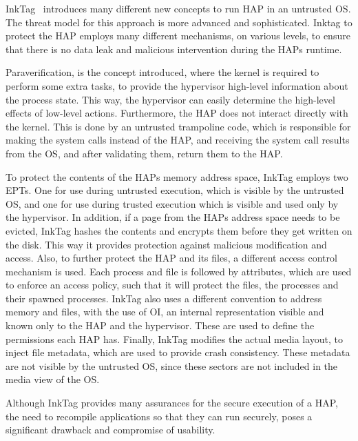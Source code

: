 \par InkTag~\cite{hofmann2013inktag} introduces many different new concepts to run \ac{HAP} in an untrusted \ac{OS}. The threat model for this approach is more advanced and sophisticated. Inktag to protect the \ac{HAP} employs many different mechanisms, on various levels, to ensure that there is no data leak and malicious intervention during the \ac{HAP}s runtime. 
\par Paraverification, is the concept introduced, where the kernel is required to perform some extra tasks, to provide the hypervisor high-level information about the process state. This way, the hypervisor can easily determine the high-level effects of low-level actions. Furthermore, the \ac{HAP} does not interact directly with the kernel. This is done by an untrusted trampoline code, which is responsible for making the system calls instead of the \ac{HAP}, and receiving the system call results from the \ac{OS}, and after validating them, return them to the \ac{HAP}.
\par To protect the contents of the \ac{HAP}s memory address space, InkTag employs two \ac{EPT}s. One for use during untrusted execution, which is visible by the untrusted \ac{OS}, and one for use during trusted execution which is visible and used only by the hypervisor. In addition, if a page from the \ac{HAP}s address space needs to be evicted, InkTag hashes the contents and encrypts them before they get written on the disk. This way it provides protection against malicious modification and access.
Also, to further protect the \ac{HAP} and its files, a different access control mechanism is used. Each process and file is followed by attributes, which are used to enforce an access policy, such that it will protect the files, the processes and their spawned processes. InkTag also uses a different convention to address memory and files, with the use of \ac{OI}, an internal representation visible and known only to the \ac{HAP} and the hypervisor. These are used to define the permissions each \ac{HAP} has.
Finally, InkTag modifies the actual media layout, to inject file metadata, which are used to provide crash consistency. These metadata are not visible by the untrusted \ac{OS}, since these sectors are not included in the media view of the \ac{OS}. 
\par Although InkTag provides many assurances for the secure execution of a \ac{HAP}, the need to recompile applications so that they can run securely, poses a significant drawback and compromise of usability.

